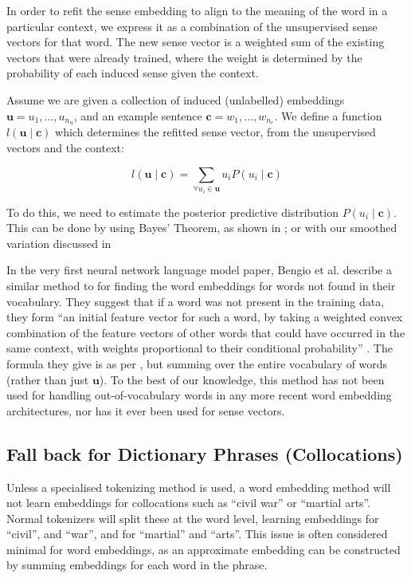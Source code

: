 \documentclass{sig-alternate}
\renewcommand{\c}{\mathbf{c}}
\renewcommand{\u}{\mathbf{u}}
\begin{document}
In order to refit the sense embedding to align to the meaning of the word in a particular context, we express it as a combination of the unsupervised sense vectors for that word.
The new sense vector is a weighted sum of the existing vectors that were already trained, where the weight is determined by the probability of each induced sense given the context.


Assume we are given a collection of induced (unlabelled) embeddings $\u={u_1,...,u_{n_u}}$, and an example sentence $\c={w_1,...,w_{n_c}}$. We define a function $l(\u \mid \c )$ which determines the refitted sense vector, from the unsupervised vectors and the context:

\begin{equation} \label{eq:synth}
l(\u \mid \c ) = \sum_{\forall u_i \in \u} u_i P(u_i \mid \c)
\end{equation}

To do this, we need to estimate the posterior predictive distribution $P(u_i \mid \c)$.
This can be done by using Bayes' Theorem, as shown in ; or with our smoothed variation discussed in 


In the very first neural network language model paper, Bengio et al. \parencite{NPLM} describe a similar method to  for finding the word embeddings for words not found in their vocabulary. They suggest that if a word was not present in the training data, they form \enquote{an initial feature vector for such a word, by taking a weighted convex combination of the feature vectors of other words that could have occurred in the same context, with weights proportional to their conditional probability} \parencite{NPLM}. The formula they give is as per , but summing over the entire vocabulary of words (rather than just $\u$). To the best of our knowledge, this method has not been used for handling out-of-vocabulary words in any more recent word embedding architectures, nor has it ever been used for sense vectors.


\subsection {Fall back for Dictionary Phrases (Collocations)}
Unless a specialised tokenizing method is used, a word embedding method will not learn embeddings for collocations such as ``civil war'' or ``martial arts''. Normal tokenizers will split these at the word level, learning embeddings for ``civil'', and ``war'', and for ``martial'' and ``arts''. This issue is often considered minimal for word embeddings, as an approximate embedding can be constructed by summing embeddings for each word in the phrase.
\end{document}
